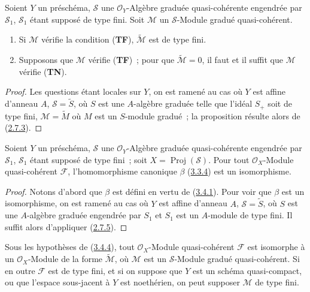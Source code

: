 \begin{proposition}[3.4.3]
\label{II.3.4.3-fr}
Soient $Y$ un préschéma, $\mathcal{S}$ une $\mathcal{O}_Y$-Algèbre graduée
quasi-cohérente engendrée par $\mathcal{S}_1$, $\mathcal{S}_1$ étant supposé
de type fini. Soit $\mathcal{M}$ un $\mathcal{S}$-Module gradué
quasi-cohérent.
\begin{enumerate}
  \item[\rm(i)] Si $\mathcal{M}$ vérifie la condition (\textbf{TF}),
    $\widetilde{\mathcal{M}}$ est de type fini.
  \item[\rm(ii)] Supposons que $\mathcal{M}$ vérifie (\textbf{TF})~; pour que
    $\widetilde{\mathcal{M}}=0$, il faut et il suffit que $\mathcal{M}$
    vérifie (\textbf{TN}).
\end{enumerate}
\end{proposition}

\begin{proof}
Les questions étant locales sur $Y$, on est ramené au cas où $Y$ est affine
d'anneau $A$, $\mathcal{S}=\widetilde{S}$, où $S$ est une $A$-algèbre graduée
telle que l'idéal $S_+$ soit de type fini,
$\mathcal{M}=\widetilde{M}$ où $M$ est un $S$-module gradué~; la proposition
résulte alors de (\hyperref[II.2.7.3-fr]{2.7.3}).
\end{proof}

\begin{theorem}[3.4.4]
\label{II.3.4.4-fr}
Soient $Y$ un préschéma, $\mathcal{S}$ une $\mathcal{O}_Y$-Algèbre graduée
quasi-cohérente engendrée par $\mathcal{S}_1$, $\mathcal{S}_1$ étant supposé
de type fini~; soit $X=\operatorname{Proj}(\mathcal{S})$. Pour tout
$\mathcal{O}_X$-Module quasi-cohérent $\mathcal{F}$, l'homomorphisme canonique
$\beta$ (\hyperref[II.3.3.4-fr]{3.3.4}) est un isomorphisme.
\end{theorem}

\begin{proof}
Notons d'abord que $\beta$ est défini en vertu de
(\hyperref[II.3.4.1-fr]{3.4.1}). Pour voir que $\beta$ est un isomorphisme,
on est ramené au cas où $Y$ est affine d'anneau $A$,
$\mathcal{S}=\widetilde{S}$, où $S$ est une $A$-algèbre graduée engendrée par
$S_1$ et $S_1$ est un $A$-module de type fini. Il suffit alors d'appliquer
(\hyperref[II.2.7.5-fr]{2.7.5}).
\end{proof}

\begin{corollary}[3.4.5]
\label{II.3.4.5-fr}
Sous les hypothèses de (\hyperref[II.3.4.4-fr]{3.4.4}), tout
$\mathcal{O}_X$-Module quasi-cohérent $\mathcal{F}$ est isomorphe à un
$\mathcal{O}_X$-Module de la forme $\widetilde{\mathcal{M}}$, où
$\mathcal{M}$ est un $\mathcal{S}$-Module gradué quasi-cohérent. Si en outre
$\mathcal{F}$ est de type fini, et si on suppose que $Y$ est un schéma
quasi-compact, ou que l'espace sous-jacent à $Y$ est noethérien, on peut
supposer $\mathcal{M}$ de type fini.
\end{corollary}

